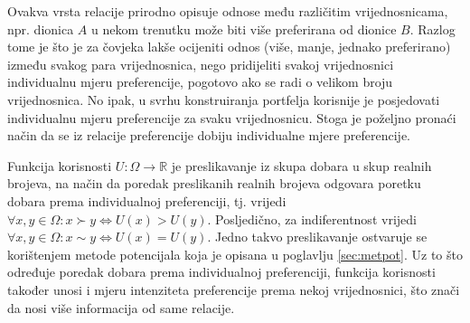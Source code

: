 \documentclass[lmodern, utf8, diplomski, numeric]{fer}
\newcommand{\q}{\left}
\newcommand{\w}{\right}
\begin{document}
  Ovakva vrsta relacije prirodno opisuje odnose među različitim vrijednosnicama, npr. dionica $A$ u nekom trenutku može biti više preferirana od dionice $B$.
  Razlog tome je što je za čovjeka lakše ocijeniti odnos (više, manje, jednako preferirano) između svakog para vrijednosnica, nego pridijeliti svakoj vrijednosnici individualnu mjeru preferencije, pogotovo ako se radi o velikom broju vrijednosnica.
  No ipak, u svrhu konstruiranja portfelja korisnije je posjedovati individualnu mjeru preferencije za svaku vrijednosnicu.
  Stoga je poželjno pronaći način da se iz relacije preferencije dobiju individualne mjere preferencije.
  
  Funkcija korisnosti  $U\colon \Omega \to \mathbb{R}$ je preslikavanje iz skupa dobara u skup realnih brojeva, na način da poredak preslikanih realnih brojeva odgovara poretku dobara prema individualnoj preferenciji, tj. vrijedi $\forall x, y \in \Omega \colon x \succ y \Leftrightarrow U\q(x\w) > U\q(y\w)$.
  Posljedično, za indiferentnost vrijedi $\forall x, y \in \Omega \colon x \sim y \Leftrightarrow U\q(x\w) = U\q(y\w)$.
  Jedno takvo preslikavanje ostvaruje se korištenjem metode potencijala koja je opisana u poglavlju \ref{sec:metpot}.
  Uz to što određuje poredak dobara prema individualnoj preferenciji, funkcija korisnosti također unosi i mjeru intenziteta preferencije prema nekoj vrijednosnici, što znači da nosi više informacija od same relacije.
\end{document}
